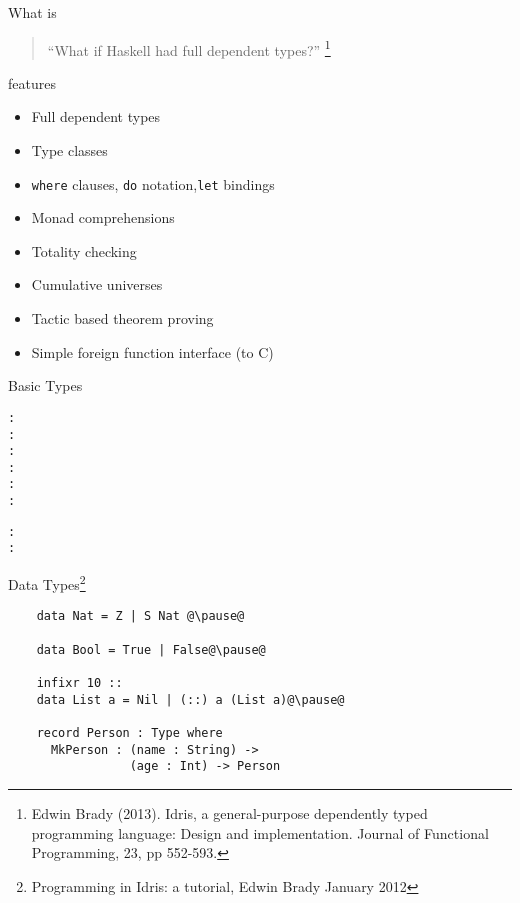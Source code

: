 \documentclass[rail]{beamer}
\title{\idris}
\subtitle{A language with dependent types}
\author{Alejandro Gómez-Londoño}
\date{31th March, 2014}
\institute{EAFIT University}
\begin{document}
\begin{frame}
  \titlepage
\end{frame}

\begin{frame}{What is \idris}
  \begin{quotation}
    “What if Haskell had full dependent types?”
    \footnote[frame,1]{ Edwin Brady (2013). Idris, a general-purpose
      dependently typed programming language: Design and
      implementation. Journal of Functional Programming, 23, pp
      552-593.}
  \end{quotation}
\end{frame}

\begin{frame}{\idris features}
  \begin{itemize}
    \item Full dependent types
    \item Type classes
    \item \texttt{where} clauses, \texttt{do} notation,\texttt{let} bindings
    \item Monad comprehensions
    \item Totality checking
    \item Cumulative universes
    \item Tactic based theorem proving
    \item Simple foreign function interface (to C)
  \end{itemize}
\end{frame}

\begin{frame}[fragile]{\idris}{Basic Types}
\begin{alltt}

  {\color{red}{Z}} : {\color{blue}{Nat}}
  {\color{red}{50}} : {\color{blue}{Integer}}
  {\color{red}{1.23}} : {\color{blue}{Float}}
  {\color{red}{True}} : {\color{blue}{Bool}}\pause
  {\color{red}{'a'}} : {\color{blue}{Char}}
  {\color{red}{"foo"}} : {\color{blue}{String}}\pause

  {\color{red}{[1,2,3]}} : {\color{blue}{List Integer}}
  {\color{red}{[1,2,3]}} : {\color{blue}{Vect 3 Integer}}
\end{alltt}
\end{frame}

\begin{frame}[fragile]{\idris}
  {Data Types\footnote[frame,1]
    {Programming in Idris: a tutorial, Edwin Brady January 2012}}
  \begin{lstlisting}
    data Nat = Z | S Nat @\pause@

    data Bool = True | False@\pause@

    infixr 10 ::
    data List a = Nil | (::) a (List a)@\pause@

    record Person : Type where
      MkPerson : (name : String) ->
                 (age : Int) -> Person
  \end{lstlisting}
\end{frame}
\end{document}
